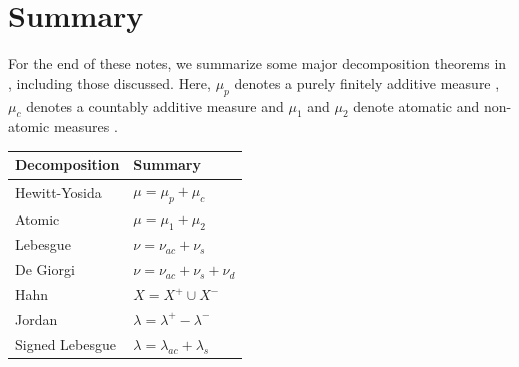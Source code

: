\documentclass[10pt, leqno]{amsart}
\theoremstyle{definition}
\theoremstyle{remark}
\begin{document}
    \section{Summary} \phantom{}

    For the end of these notes, we summarize some major decomposition theorems in \cite[pp. 1-119]{Fonseca}, including those discussed. Here, \(\mu_p\) denotes a purely finitely additive measure \cite[p. 8]{Fonseca}, \(\mu_c\) denotes a countably additive measure \cite[p. 5]{Fonseca} and \(\mu_1\) and \(\mu_2\) denote atomatic and non-atomic measures \cite[p. 10]{Fonseca}.

    \phantom{}

    \begin{minipage}{\linewidth}
        \centering
        \begin{tabular}{C{4cm}|C{3cm}}
            Decomposition & Summary \\\hline
            Hewitt-Yosida \cite[pp. 8-9]{Fonseca} & \(\mu = \mu_p + \mu_c\)\\
            Atomic \cite[pp. 13-16]{Fonseca} & \(\mu = \mu_1 + \mu_2\)\\
            Lebesgue & \(\nu = \nu_{ac} + \nu_s\)\\
            De Giorgi & \(\nu = \nu_{ac} + \nu_s + \nu_d\)\\
            Hahn & \(X = X^+ \cup X^-\)\\
            Jordan & \(\lambda = \lambda^+ - \lambda^-\)\\
            Signed Lebesgue & \(\lambda = \lambda_{ac} + \lambda_s\)
        \end{tabular}
    \end{minipage}

    \printbibliography{}
\end{document}
